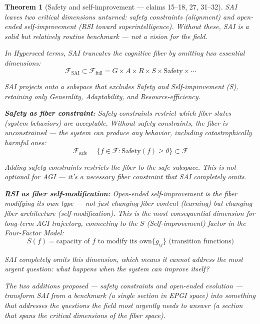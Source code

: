 \documentclass[11pt,a4paper]{article}
\newtheorem{theorem}[definition]{Theorem}
\begin{document}
\begin{theorem}[Safety and self-improvement --- claims 15--18, 27, 31--32]
\label{thm:missing}
SAI leaves two critical dimensions unturned: safety constraints
(alignment) and open-ended self-improvement (RSI toward superintelligence).
Without these, SAI is a solid but relatively routine benchmark --- not a
vision for the field.

In Hyperseed terms, SAI \emph{truncates the cognitive fiber} by omitting
two essential dimensions:
\[
  \mathcal{F}_{\text{SAI}} \subset \mathcal{F}_{\text{full}}
  = G \times A \times R \times S \times \text{Safety} \times \cdots
\]

SAI projects onto a subspace that excludes Safety and Self-improvement
(S), retaining only Generality, Adaptability, and Resource-efficiency.

\textbf{Safety as fiber constraint:} Safety constraints restrict which
fiber states (system behaviors) are acceptable. Without safety
constraints, the fiber is unconstrained --- the system can produce any
behavior, including catastrophically harmful ones:
\[
  \mathcal{F}_{\text{safe}} = \{f \in \mathcal{F} :
  \text{Safety}(f) \geq \theta\} \subset \mathcal{F}
\]

Adding safety constraints restricts the fiber to the safe subspace.
This is not optional for AGI --- it's a necessary fiber constraint that
SAI completely omits.

\textbf{RSI as fiber self-modification:} Open-ended self-improvement is
the fiber modifying its own type --- not just changing fiber content
(learning) but changing fiber architecture (self-modification). This is
the most consequential dimension for long-term AGI trajectory, connecting
to the $S$ (Self-improvement) factor in the Four-Factor Model:
\[
  S(f) = \text{capacity of } f \text{ to modify its own}
  \{g_{ij}\} \text{ (transition functions)}
\]

SAI completely omits this dimension, which means it cannot address the
most urgent question: what happens when the system can improve itself?

The two additions proposed --- safety constraints and open-ended
evolution --- transform SAI from a benchmark (a single section in EPGI
space) into something that addresses the questions the field most urgently
needs to answer (a section that spans the critical dimensions of the
fiber space).
\end{theorem}

\end{document}
